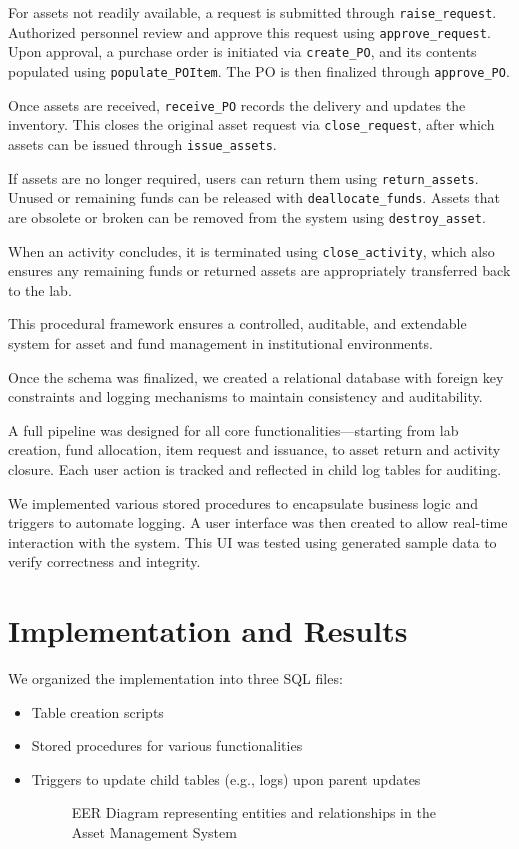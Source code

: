 \documentclass[11pt]{article}
\begin{document}
For assets not readily available, a request is submitted through \texttt{raise\_request}. Authorized personnel review and approve this request using \texttt{approve\_request}. Upon approval, a purchase order is initiated via \texttt{create\_PO}, and its contents populated using \texttt{populate\_POItem}. The PO is then finalized through \texttt{approve\_PO}.

Once assets are received, \texttt{receive\_PO} records the delivery and updates the inventory. This closes the original asset request via \texttt{close\_request}, after which assets can be issued through \texttt{issue\_assets}.

If assets are no longer required, users can return them using \texttt{return\_assets}. Unused or remaining funds can be released with \texttt{deallocate\_funds}. Assets that are obsolete or broken can be removed from the system using \texttt{destroy\_asset}.

When an activity concludes, it is terminated using \texttt{close\_activity}, which also ensures any remaining funds or returned assets are appropriately transferred back to the lab.

This procedural framework ensures a controlled, auditable, and extendable system for asset and fund management in institutional environments.

Once the schema was finalized, we created a relational database with foreign key constraints and logging mechanisms to maintain consistency and auditability.

A full pipeline was designed for all core functionalities—starting from lab creation, fund allocation, item request and issuance, to asset return and activity closure. Each user action is tracked and reflected in child log tables for auditing.

We implemented various stored procedures to encapsulate business logic and triggers to automate logging. A user interface was then created to allow real-time interaction with the system. This UI was tested using generated sample data to verify correctness and integrity.

\section{Implementation and Results}
We organized the implementation into three SQL files:
\begin{itemize}
  \item Table creation scripts
  \item Stored procedures for various functionalities
  \item Triggers to update child tables (e.g., logs) upon parent updates


\begin{sidewaysfigure}[p]
  \centering
  
  \caption{EER Diagram representing entities and relationships in the Asset Management System}
  \label{fig:eer_diagram}
\end{sidewaysfigure}
\end{itemize}
\end{document}

